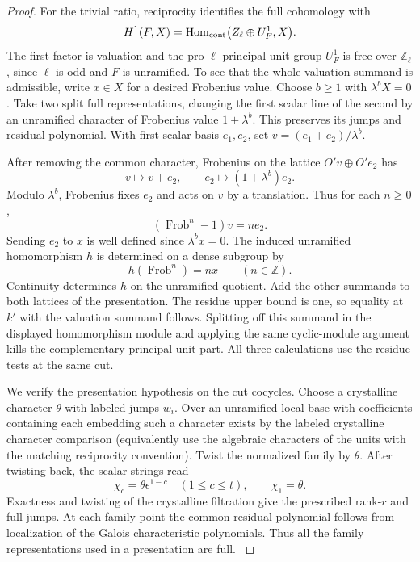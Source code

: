 \begin{proof}
For the trivial ratio, reciprocity identifies the full
cohomology with
\[
 H^1(F,X)=\operatorname{Hom}_{\rm cont}
        \bigl(\mathbb Z_\ell\oplus U_F^1,X\bigr).
\]
The first factor is valuation and the pro-\(\ell\) principal
unit group \(U_F^1\) is free over \(\mathbb Z_\ell\), since
\(\ell\) is odd and \(F\) is unramified. To see that the whole
valuation summand is admissible, write \(x\in X\) for a desired
Frobenius value. Choose \(b\ge1\) with \(\lambda^b X=0\).
Take two split full representations, changing the first scalar
line of the second by an unramified character of Frobenius
value \(1+\lambda^b\). This preserves its jumps and residual
polynomial. With first scalar basis \(e_1,e_2\), set
\(v=(e_1+e_2)/\lambda^b\).

After removing the common character,
Frobenius on the lattice \(O'v\oplus O'e_2\) has
\[
           v\longmapsto v+e_2,\qquad
           e_2\longmapsto(1+\lambda^b)e_2 .
\]
Modulo \(\lambda^b\), Frobenius fixes \(e_2\) and acts on \(v\) by a
translation. Thus for each \(n\ge0\),
\[
  (\operatorname{Frob}^n-1)v=n e_2 .
\]
Sending \(e_2\) to \(x\) is well defined since \(\lambda^b x=0\).
The induced unramified homomorphism \(h\) is determined on a dense subgroup by
\[
 h(\operatorname{Frob}^{n})=nx\qquad(n\in\mathbb Z).
\]
Continuity determines \(h\) on the unramified quotient. Add the other summands to both
lattices of the presentation.
The residue upper bound is one, so equality at \(k'\)
with the valuation summand follows. Splitting off this
summand in the displayed homomorphism module and applying
the same cyclic-module argument kills the complementary
principal-unit part. All three calculations use the residue
tests at the same cut.
\label{cor:large-prime-length-3}

We verify the presentation hypothesis on the cut cocycles. Choose a
crystalline character \(\theta\) with labeled jumps \(w_i\).
Over an unramified local base with coefficients containing each
embedding such a character exists by the labeled crystalline character
comparison (equivalently use the algebraic characters of the units
with the matching reciprocity convention).
Twist the normalized family by \(\theta\). After twisting back, the scalar strings read
\[
 \chi_c=\theta\epsilon^{1-c}\quad(1\le c\le t),\qquad\chi_1=\theta.
\]
Exactness and twisting of the crystalline
filtration give the prescribed rank-\(r\) and full jumps.
At each family point the common residual polynomial follows from
localization of the Galois characteristic polynomials. Thus all
the family representations used in a presentation are full.
\label{cor:large-prime-length-4}


\end{proof}
